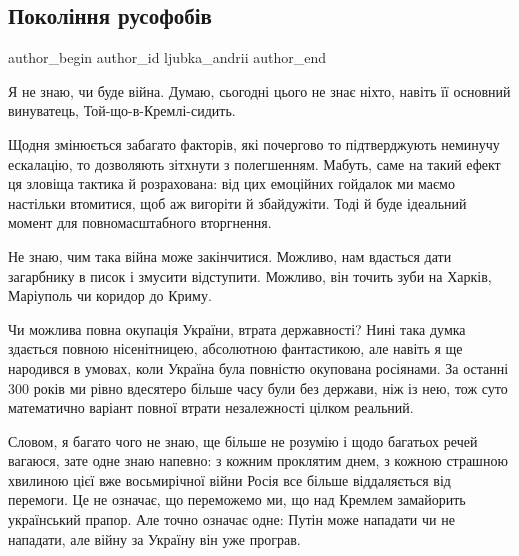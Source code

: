  
 
 
 
 
 
\subsection{Покоління русофобів}
\label{sec:09_02_2022.stz.news.ua.zbruc.1.pokolinnja_rusofobiv}
 
\ifcmt
 author_begin
   author_id ljubka_andrii
 author_end
\fi

Я не знаю, чи буде війна. Думаю, сьогодні цього не знає ніхто, навіть її
основний винуватець, Той-що-в-Кремлі-сидить.

Щодня змінюється забагато факторів, які почергово то підтверджують неминучу
ескалацію, то дозволяють зітхнути з полегшенням. Мабуть, саме на такий ефект ця
зловіща тактика й розрахована: від цих емоційних гойдалок ми маємо настільки
втомитися, щоб аж вигоріти й збайдужіти. Тоді й буде ідеальний момент для
повномасштабного вторгнення.


Не знаю, чим така війна може закінчитися. Можливо, нам вдасться дати загарбнику
в писок і змусити відступити. Можливо, він точить зуби на Харків, Маріуполь чи
коридор до Криму.

Чи можлива повна окупація України, втрата державності? Нині така думка здається
повною нісенітницею, абсолютною фантастикою, але навіть я ще народився в
умовах, коли Україна була повністю окупована росіянами. За останні 300 років ми
рівно вдесятеро більше часу були без держави, ніж із нею, тож суто математично
варіант повної втрати незалежності цілком реальний.

Словом, я багато чого не знаю, ще більше не розумію і щодо багатьох речей
вагаюся, зате одне знаю напевно: з кожним проклятим днем, з кожною страшною
хвилиною цієї вже восьмирічної війни Росія все більше віддаляється від
перемоги. Це не означає, що переможемо ми, що над Кремлем замайорить
український прапор. Але точно означає одне: Путін може нападати чи не нападати,
але війну за Україну він уже програв.

